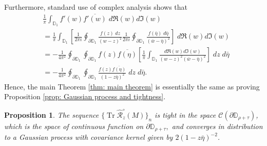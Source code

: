 \documentclass[12pt]{amsart}
\theoremstyle{plain}
\newtheorem{prop}[Thm]{Proposition}
\theoremstyle{definition}
\newcommand{\Tr}{\operatorname{Tr}}
\begin{document}


Furthermore, standard use of complex analysis shows that 
\begin{align*}
    &\frac{1}{\pi}\int_{\mathbb{D}_{1}}f'(w)\overline{f'(w)}\;d\mathfrak{R}(w)d\mathfrak{I}(w)\\
    &=\frac{1}{\pi}\int_{\mathbb{D}_{1}}\left[\frac{1}{2\pi i}\oint_{\partial\mathbb{D}_{1}}\frac{f(z)\;dz}{(w-z)^{2}}\frac{1}{2\pi i}\oint_{\partial\mathbb{D}_{1}}\frac{f(\bar\eta)\;d\bar\eta}{(\bar w-\bar\eta)^{2}}\right]\;d\mathfrak{R}(w)d\mathfrak{I}(w)\\
    &=-\frac{1}{4\pi^{2}}\oint_{\partial\mathbb{D}_{1}}\oint_{\partial\mathbb{D}_{1}}f(z)\overline{f(\eta)}\left[\frac{1}{\pi}\int_{\mathbb{D}_{1}}\frac{d\mathfrak{R}(w)d\mathfrak{I}(w)}{(w-z)^{2}(\bar w-\bar\eta)^{2}}\right]\;dz\;d\bar\eta\\
    &=-\frac{1}{4\pi^{2}}\oint_{\partial\mathbb{D}_{1}}\oint_{\partial\mathbb{D}_{1}}\frac{f(z)\overline{f(\eta)}}{(1-z\bar\eta)^{2}}\;dz\;d\bar\eta.
\end{align*}
Hence, the main Theorem \ref{thm: main theorem} is essentially the same as proving Proposition \ref{prop: Gaussian process and tightness}.
\begin{prop}{\label{prop: Gaussian process and tightness}}
The sequence $\{\Tr \hat{\mathcal{R}}_{z}^{\circ}(M)\}_{n}$ is tight in the space $\mathcal{C}(\partial{\mathbb{D}}_{\rho+\tau})$, which is the space of continuous function on $\partial\mathbb{D}_{\rho+\tau},$ and converges in distribution to a Gaussian process with covariance kernel given by $2(1-z\bar \eta)^{-2}$.
\end{prop}
\end{document}

